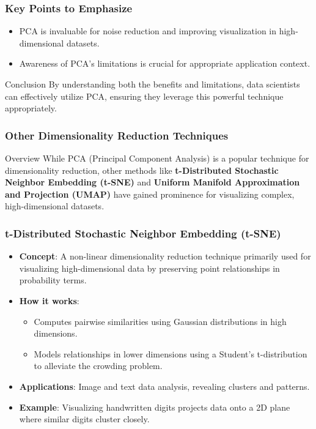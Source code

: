 \documentclass[aspectratio=169]{beamer}
\begin{document}
\begin{frame}[fragile]
    \frametitle{Key Points to Emphasize}
    \begin{itemize}
        \item PCA is invaluable for noise reduction and improving visualization in high-dimensional datasets.
        \item Awareness of PCA's limitations is crucial for appropriate application context.
    \end{itemize}
    \begin{block}{Conclusion}
        By understanding both the benefits and limitations, data scientists can effectively utilize PCA, ensuring they leverage this powerful technique appropriately.
    \end{block}
\end{frame}

\begin{frame}[fragile]
    \frametitle{Other Dimensionality Reduction Techniques}
    \begin{block}{Overview}
        While PCA (Principal Component Analysis) is a popular technique for dimensionality reduction, other methods like \textbf{t-Distributed Stochastic Neighbor Embedding (t-SNE)} and \textbf{Uniform Manifold Approximation and Projection (UMAP)} have gained prominence for visualizing complex, high-dimensional datasets.
    \end{block}
\end{frame}

\begin{frame}[fragile]
    \frametitle{t-Distributed Stochastic Neighbor Embedding (t-SNE)}
    \begin{itemize}
        \item \textbf{Concept}: A non-linear dimensionality reduction technique primarily used for visualizing high-dimensional data by preserving point relationships in probability terms.
        
        \item \textbf{How it works}:
        \begin{itemize}
            \item Computes pairwise similarities using Gaussian distributions in high dimensions.
            \item Models relationships in lower dimensions using a Student's t-distribution to alleviate the crowding problem.
        \end{itemize}
        
        \item \textbf{Applications}: Image and text data analysis, revealing clusters and patterns.
        
        \item \textbf{Example}: Visualizing handwritten digits projects data onto a 2D plane where similar digits cluster closely.
    \end{itemize}
\end{frame}
\end{document}
